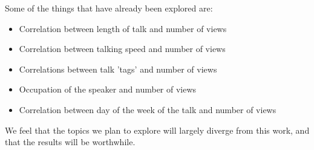\documentclass{article}
\begin{document}
Some of the things that have already been explored are: 
\begin{itemize}
	\item Correlation between length of talk and number of views
	\item Correlation between talking speed and number of views
	\item Correlations between talk 'tags' and number of views
	\item Occupation of the speaker and number of views
	\item Correlation between day of the week of the talk and number of views	
\end{itemize}

We feel that the topics we plan to explore will largely diverge from this work, and that the results will be worthwhile.
\end{document}
